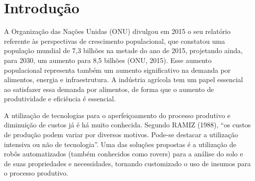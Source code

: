 \chapter*[Introdução]{Introdução}

A Organização das Nações Unidas (ONU) divulgou em 2015 o seu relatório referente às perspectivas de crescimento populacional, que constatou uma população mundial de 7,3 bilhões na metade do ano de 2015, projetando ainda, para 2030, um aumento para 8,5 bilhões (ONU, 2015). Esse aumento populacional representa também um aumento significativo na demanda por alimentos, energia e infraestrutura. A indústria agrícola tem um papel essencial ao satisfazer essa demanda por alimentos, de forma que o aumento de produtividade e eficiência é essencial.

A utilização de tecnologias para o aperfeiçoamento do processo produtivo e diminuição de custos já é há muito conhecida. Segundo RAMIZ (1988), “os custos de produção podem variar por diversos motivos. Pode-se destacar a utilização intensiva ou não de tecnologia”. Uma das soluções propostas é a utilização de robôs automatizados (também conhecidos como rovers) para a análise do solo e de suas propriedades e necessidades, tornando customizado o uso de insumos para o processo produtivo.

